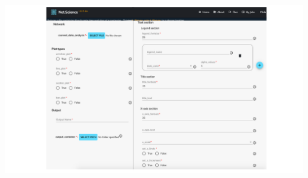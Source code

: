 \documentclass[landscape,paperwidth=70in,paperheight=46in,fontscale=0.225]{baposter} %
\begin{document}
\begin{poster}
{\begin{center}
\includegraphics[scale=0.28]{figures/plot_input.pdf}
\end{center}





%
%
%

}
\end{poster}
\end{document}
